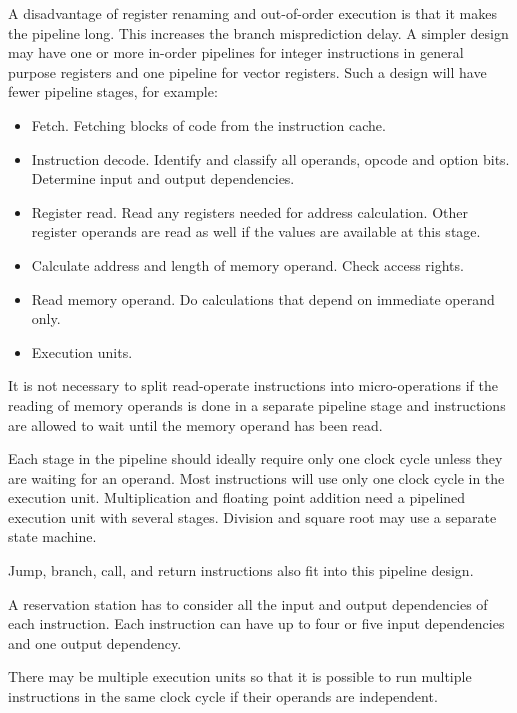 \documentclass[forwardcom.tex]{subfiles}
\begin{document}
A disadvantage of register renaming and out-of-order execution is that it makes the pipeline long. This increases the branch misprediction delay. A simpler design may have one or more in-order pipelines for integer instructions in general purpose registers and one pipeline for vector registers. Such a design will have fewer pipeline stages, for example:
\vv

\begin{itemize}
\item  Fetch. Fetching blocks of code from the instruction cache. 

\item  Instruction decode. Identify and classify all operands, opcode and option bits. Determine input and output dependencies.

\item  Register read. Read any registers needed for address calculation. Other register operands are read as well if the values are available at this stage.

\item  Calculate address and length of memory operand. Check access rights.

\item  Read memory operand. Do calculations that depend on immediate operand only.

\item  Execution units.  

\end{itemize}
\vv

It is not necessary to split read-operate instructions into micro-operations if the reading of memory operands is done in a separate pipeline stage and instructions are allowed to wait until the memory operand has been read. 
\vv

Each stage in the pipeline should ideally require only one clock cycle unless they are waiting for an operand.  Most instructions will use only one clock cycle in the execution unit. Multiplication and floating point addition need a pipelined execution unit with several stages. Division and square root may use a separate state machine. 
\vv

Jump, branch, call, and return instructions also fit into this pipeline design. 
\vv

A reservation station has to consider all the input and output dependencies of each instruction. Each instruction can have up to four or five input dependencies and one output dependency. 
\vv

There may be multiple execution units so that it is possible to run multiple instructions in the same clock cycle if their operands are independent. 
\vv
\end{document}
